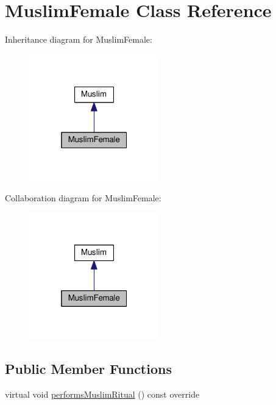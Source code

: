 \hypertarget{classMuslimFemale}{}\section{Muslim\+Female Class Reference}
\label{classMuslimFemale}


Inheritance diagram for Muslim\+Female\+:
\nopagebreak
\begin{figure}[H]
\begin{center}
\leavevmode
\includegraphics[width=160pt]{classMuslimFemale__inherit__graph}
\end{center}
\end{figure}


Collaboration diagram for Muslim\+Female\+:
\nopagebreak
\begin{figure}[H]
\begin{center}
\leavevmode
\includegraphics[width=160pt]{classMuslimFemale__coll__graph}
\end{center}
\end{figure}
\subsection*{Public Member Functions}
\begin{DoxyCompactItemize}
\item 
virtual void \hyperlink{classMuslimFemale_ab08e692639df1e16fc5d41b18cb01765}{performs\+Muslim\+Ritual} () const override
\end{DoxyCompactItemize}



